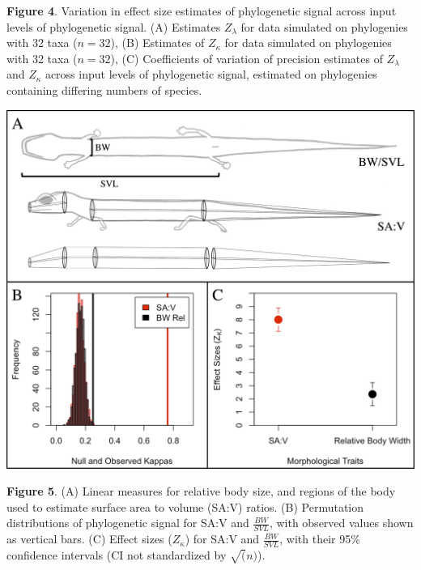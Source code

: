 \documentclass[]{article}
\begin{document}
\singlespacing \textbf{Figure 4}. Variation in effect size estimates of
phylogenetic signal across input levels of phylogenetic signal. (A)
Estimates \(Z_\lambda\) for data simulated on phylogenies with 32 taxa
(\(n=32\)), (B) Estimates of \(Z_\kappa\) for data simulated on
phylogenies with 32 taxa (\(n=32\)), (C) Coefficients of variation of
precision estimates of \(Z_\lambda\) and \(Z_\kappa\) across input
levels of phylogenetic signal, estimated on phylogenies containing
differing numbers of species.

\includegraphics[width=0.95\linewidth]{Fig5}

\singlespacing \textbf{Figure 5}. (A) Linear measures for relative body
size, and regions of the body used to estimate surface area to volume
(SA:V) ratios. (B) Permutation distributions of phylogenetic signal for
SA:V and \(\frac{BW}{SVL}\), with observed values shown as vertical
bars. (C) Effect sizes (\(Z_\kappa\)) for SA:V and \(\frac{BW}{SVL}\),
with their 95\% confidence intervals (CI not standardized by
\(\sqrt(n)\)).
\end{document}
